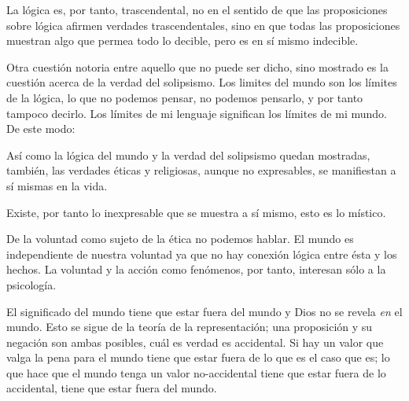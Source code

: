       La lógica es, por tanto, trascendental, no en el sentido de que las
      proposiciones sobre lógica afirmen verdades trascendentales, sino en que todas
      las proposiciones muestran algo que permea todo lo decible, pero es en sí mismo
      indecible.\autocite[cf.~][p.~166 \S2]{anscombe1959iwt}

      Otra cuestión notoria entre aquello que no puede ser dicho, sino mostrado es la
      cuestión acerca de la verdad del solipsismo. Los limites del mundo son los
      límites de la lógica, lo que no podemos pensar, no podemos pensarlo, y por tanto
      tampoco decirlo. Los límites de mi lenguaje significan los límites de mi
      mundo.\autocite[cf~.][5.6~y~5.61]{wittgenstein1922tractatus} De este modo:

      Así como la lógica del mundo y la verdad del solipsismo quedan mostradas,
      también, las verdades éticas y religiosas, aunque no expresables, se manifiestan
      a sí mismas en la vida. 

      Existe, por tanto lo inexpresable que se muestra a sí mismo, esto es lo
      místico.\autocite[cf.~][6.522]{wittgenstein1922tractatus}

      De la voluntad como sujeto de la ética no podemos
      hablar\autocite[cf.~][6.423]{wittgenstein1922tractatus}. El mundo es independiente de nuestra
      voluntad ya que no hay conexión lógica entre ésta y los hechos.
      La voluntad y la acción como fenómenos, por tanto, interesan sólo a la
      psicología.\autocite[cf.~][p.171 \S3]{anscombe1959iwt}

      El significado del mundo tiene que estar fuera del
      mundo\autocite[cf.~][6.41]{wittgenstein1922tractatus} y Dios no se revela \emph{en} el
      mundo\autocite[cf.~][6.432]{wittgenstein1922tractatus}. 
      Esto se sigue de la teoría de la representación; una proposición y su negación
      son ambas posibles, cuál es verdad es accidental.\autocite[cf.~][p.170 \S4]{anscombe1959iwt}
      Si hay un valor que valga la pena para el mundo tiene que estar fuera de lo que
      es el caso que es; lo que hace que el mundo tenga un valor no-accidental tiene
      que estar fuera de lo accidental, tiene que estar fuera del
      mundo.\autocite[cf.~][6.41]{wittgenstein1922tractatus} 

